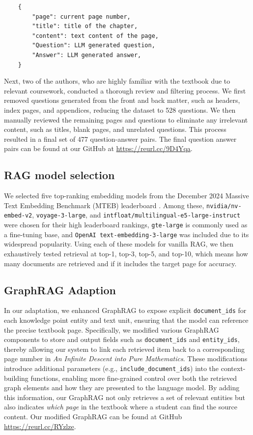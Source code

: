 \documentclass[runningheads]{llncs}
\begin{document}
\begin{verbatim}
    {
        "page": current page number,
        "title": title of the chapter,
        "content": text content of the page,
        "Question": LLM generated question,
        "Answer": LLM generated answer,
    }
\end{verbatim}

Next, two of the authors, who are highly familiar with the textbook due to relevant coursework, conducted a thorough review and filtering process. We first removed questions generated from the front and back matter, such as headers, index pages, and appendices, reducing the dataset to 528 questions. We then manually reviewed the remaining pages and questions to eliminate any irrelevant content, such as titles, blank pages, and unrelated questions. This process resulted in a final set of 477 question-answer pairs. The final question answer pairs can be found at our GitHub at \url{https://reurl.cc/9D4Yqa}.

\subsection{RAG model selection}


We selected five top-ranking embedding models from the December 2024 Massive Text Embedding Benchmark (MTEB) leaderboard \cite{muennighoff2022mteb,huggingfaceMTEBLeaderboard}. Among these, \texttt{nvidia/nv-embed-v2}, \texttt{voyage-3-large}, and \texttt{intfloat/multilingual-e5-large-instruct} were chosen for their high leaderboard rankings, \texttt{gte-large} is commonly used as a fine-tuning base, and \texttt{OpenAI text-embedding-3-large} was included due to its widespread popularity. Using each of these models for vanilla RAG, we then exhaustively tested retrieval at top-1, top-3, top-5, and top-10, which means how many documents are retrieved and if it includes the target page for accuracy.


\subsection{GraphRAG Adaption}

In our adaptation, we enhanced GraphRAG to expose explicit \texttt{document\_ids} for each knowledge point entity and text unit, ensuring that the model can reference the precise textbook page. Specifically, we modified various GraphRAG components to store and output fields such as \texttt{document\_ids} and \texttt{entity\_ids}, thereby allowing our system to link each retrieved item back to a corresponding page number in \emph{An Infinite Descent into Pure Mathematics}. These modifications introduce additional parameters (e.g., \texttt{include\_document\_ids}) into the context-building functions, enabling more fine-grained control over both the retrieved graph elements and how they are presented to the language model. By adding this information, our GraphRAG not only retrieves a set of relevant entities but also indicates \emph{which page} in the textbook where a student can find the source content. Our modified GraphRAG can be found at GitHub \url{https://reurl.cc/RYzlze}.
\end{document}
